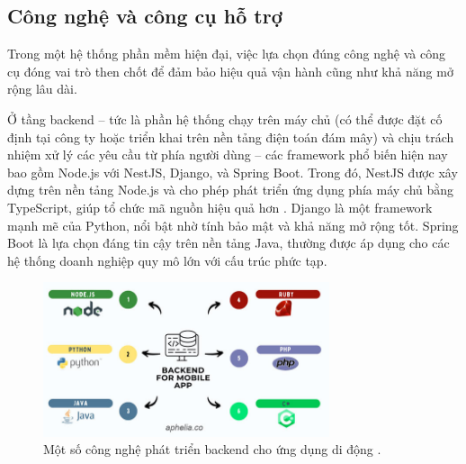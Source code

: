     \subsection{Công nghệ và công cụ hỗ trợ}
    \renewcommand{\labelitemi}{--}
    
    \hspace*{0.8cm}Trong một hệ thống phần mềm hiện đại, việc lựa chọn đúng công nghệ và công cụ đóng vai trò then chốt để đảm bảo hiệu quả vận hành cũng như khả năng mở rộng lâu dài.

    \vspace{0.5em}
    
    \hspace*{0.8cm}Ở tầng backend – tức là phần hệ thống chạy trên máy chủ (có thể được đặt cố định tại công ty hoặc triển khai trên nền tảng điện toán đám mây) và chịu trách nhiệm xử lý các yêu cầu từ phía người dùng – các framework phổ biến hiện nay bao gồm Node.js với NestJS, Django, và Spring Boot. Trong đó, NestJS được xây dựng trên nền tảng Node.js và cho phép phát triển ứng dụng phía máy chủ bằng TypeScript, giúp tổ chức mã nguồn hiệu quả hơn \cite{backendframeworks}. Django là một framework mạnh mẽ của Python, nổi bật nhờ tính bảo mật và khả năng mở rộng tốt. Spring Boot là lựa chọn đáng tin cậy trên nền tảng Java, thường được áp dụng cho các hệ thống doanh nghiệp quy mô lớn với cấu trúc phức tạp.
    
    \vspace{0.5em}
      

      \begin{figure}[H]
        \centering
        \includegraphics[width=0.75\textwidth]{images/backend_for_mobile_app.jpg}
        \caption{Một số công nghệ phát triển backend cho ứng dụng di động \cite{aphelia2023}.}
        \label{fig:fig1}
      \end{figure}
        \vspace{0.5em}
      
